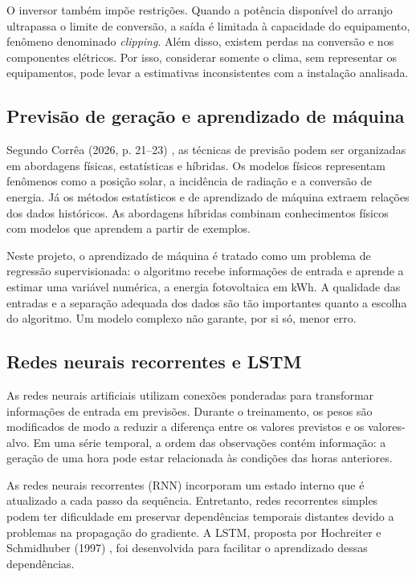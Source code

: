 O inversor também impõe restrições. Quando a potência disponível do arranjo ultrapassa o limite de conversão, a saída é limitada à capacidade do equipamento, fenômeno denominado \textit{clipping}. Além disso, existem perdas na conversão e nos componentes elétricos. Por isso, considerar somente o clima, sem representar os equipamentos, pode levar a estimativas inconsistentes com a instalação analisada.

\subsection{Previsão de geração e aprendizado de máquina}
Segundo Corrêa (2026, p. 21--23) \cite{correa}, as técnicas de previsão podem ser organizadas em abordagens físicas, estatísticas e híbridas. Os modelos físicos representam fenômenos como a posição solar, a incidência de radiação e a conversão de energia. Já os métodos estatísticos e de aprendizado de máquina extraem relações dos dados históricos. As abordagens híbridas combinam conhecimentos físicos com modelos que aprendem a partir de exemplos.

Neste projeto, o aprendizado de máquina é tratado como um problema de regressão supervisionada: o algoritmo recebe informações de entrada e aprende a estimar uma variável numérica, a energia fotovoltaica em kWh. A qualidade das entradas e a separação adequada dos dados são tão importantes quanto a escolha do algoritmo. Um modelo complexo não garante, por si só, menor erro.

\subsection{Redes neurais recorrentes e LSTM}
As redes neurais artificiais utilizam conexões ponderadas para transformar informações de entrada em previsões. Durante o treinamento, os pesos são modificados de modo a reduzir a diferença entre os valores previstos e os valores-alvo. Em uma série temporal, a ordem das observações contém informação: a geração de uma hora pode estar relacionada às condições das horas anteriores.

As redes neurais recorrentes (RNN) incorporam um estado interno que é atualizado a cada passo da sequência. Entretanto, redes recorrentes simples podem ter dificuldade em preservar dependências temporais distantes devido a problemas na propagação do gradiente. A LSTM, proposta por Hochreiter e Schmidhuber (1997) \cite{lstm}, foi desenvolvida para facilitar o aprendizado dessas dependências.

